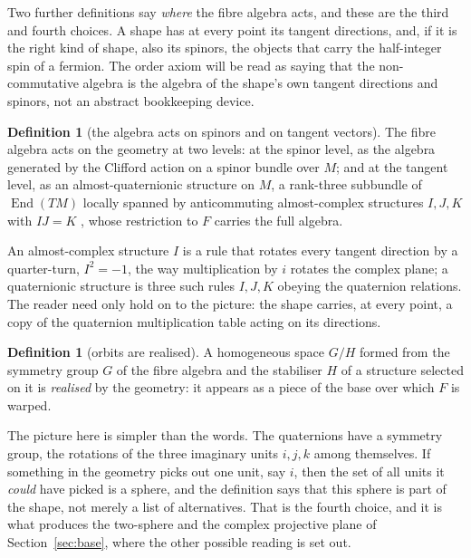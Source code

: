 \documentclass[11pt,a4paper]{article}
\theoremstyle{plain}
\theoremstyle{definition}
\newtheorem{definition}[theorem]{Definition}
\theoremstyle{remark}
\begin{document}
Two further definitions say \emph{where} the fibre algebra acts, and these are the third and fourth choices. A shape has at every point its tangent directions, and, if it is the right kind of shape, also its spinors, the objects that carry the half-integer spin of a fermion. The order axiom will be read as saying that the non-commutative algebra is the algebra of the shape's own tangent directions and spinors, not an abstract bookkeeping device.

\begin{definition}[the algebra acts on spinors and on tangent vectors]\label{def:levels}
The fibre algebra acts on the geometry at two levels: at the spinor level, as the algebra generated by the Clifford action on a spinor bundle over $M$; and at the tangent level, as an almost-quaternionic structure on $M$, a rank-three subbundle of $\operatorname{End}(TM)$ locally spanned by anticommuting almost-complex structures $I,J,K$ with $IJ=K$ \cite{Salamon1982}, whose restriction to $F$ carries the full algebra.
\end{definition}

An almost-complex structure $I$ is a rule that rotates every tangent direction by a quarter-turn, $I^{2}=-1$, the way multiplication by $i$ rotates the complex plane; a quaternionic structure is three such rules $I,J,K$ obeying the quaternion relations. The reader need only hold on to the picture: the shape carries, at every point, a copy of the quaternion multiplication table acting on its directions.

\begin{definition}[orbits are realised]\label{def:orbits}
A homogeneous space $G/H$ formed from the symmetry group $G$ of the fibre algebra and the stabiliser $H$ of a structure selected on it is \emph{realised} by the geometry: it appears as a piece of the base over which $F$ is warped.
\end{definition}

The picture here is simpler than the words. The quaternions have a symmetry group, the rotations of the three imaginary units $i,j,k$ among themselves. If something in the geometry picks out one unit, say $i$, then the set of all units it \emph{could} have picked is a sphere, and the definition says that this sphere is part of the shape, not merely a list of alternatives. That is the fourth choice, and it is what produces the two-sphere and the complex projective plane of Section~\ref{sec:base}, where the other possible reading is set out.
\end{document}
